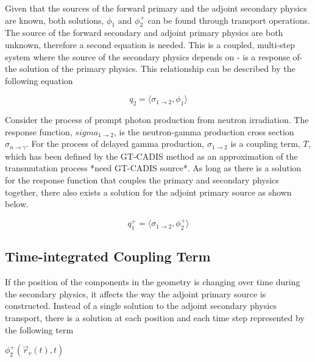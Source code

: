 Given that the sources of the forward primary and the adjoint secondary physics
are known, both solutions, $ \phi_{1} $ and
$\phi_{2}^{+} $ can be found through transport operations.
The source of the forward secondary and adjoint primary physics are both
unknown, therefore a second equation is needed.  This is a coupled, multi-step
system where the source of the secondary physics depends on - is a response of-
the solution of the primary physics.  This relationship can be described by the following equation

 \begin{equation}\label{eq:fwd_src}
	 q_{2} =
	 \langle \sigma_{1\rightarrow2}, \phi_{1} \rangle
 \end{equation}

Consider the process of prompt photon production from neutron irradiation.
The response function, $sigma_{1\rightarrow2}$, is the neutron-gamma production
cross section $\sigma_{n\rightarrow\gamma}$.  For the process of delayed gamma
production, $\sigma_{1\rightarrow2}$ is a
coupling term, $T$, which has been defined by the GT-CADIS method as an approximation of the transmutation
process *need GT-CADIS source*.  As long as there is a solution for the
response function that couples the primary and secondary physics together,
there also exists a solution for the adjoint primary source as shown below.

 \begin{equation}\label{eq:adj_src_1}
	 q_{1}^{+} = 
	 \langle \sigma_{1\rightarrow2}, \phi_{2}^{+} \rangle
 \end{equation}



\subsection{Time-integrated Coupling Term}
If the position of the components in the geometry is changing over time during
the secondary physics, it affects the way the adjoint primary source is
constructed.  Instead of a single solution to the 
adjoint secondary physics transport, there is a 
solution at each position and each time step represented by the following term

	$ \phi_{2}^{+}(\overrightarrow{r}_{v}(t), t)$

